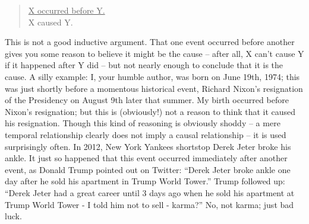 \begin{quote}\underline{X occurred before Y.} \\
X caused Y.\end{quote}

This is not a good inductive argument. That one event occurred before another gives you some
reason to believe it might be the cause -- after all, X can't cause Y if it happened after Y did -- but
not nearly enough to conclude that it is the cause. A silly example: I, your humble author, was
born on June 19th, 1974; this was just shortly before a momentous historical event, Richard Nixon's
resignation of the Presidency on August 9th later that summer. My birth occurred before Nixon's
resignation; but this is (obviously!) not a reason to think that it caused his resignation.
Though this kind of reasoning is obviously shoddy -- a mere temporal relationship clearly does not
imply a causal relationship -- it is used surprisingly often. In 2012, New York Yankees shortstop
Derek Jeter broke his ankle. It just so happened that this event occurred immediately after another
event, as Donald Trump pointed out on Twitter: ``Derek Jeter broke ankle one day after he sold his
apartment in Trump World Tower.'' Trump followed up: ``Derek Jeter had a great career until 3
days ago when he sold his apartment at Trump World Tower - I told him not to sell - karma?'' No, not karma; just bad luck.

